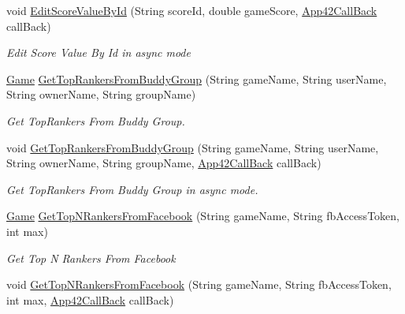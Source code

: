 \begin{DoxyCompactItemize}
void \hyperlink{classcom_1_1shephertz_1_1app42_1_1paas_1_1sdk_1_1csharp_1_1game_1_1_score_board_service_af598d5892afefa1c9a77d72020ccd635}{Edit\+Score\+Value\+By\+Id} (String score\+Id, double game\+Score, \hyperlink{interfacecom_1_1shephertz_1_1app42_1_1paas_1_1sdk_1_1csharp_1_1_app42_call_back}{App42\+Call\+Back} call\+Back)
\begin{DoxyCompactList}\small\item\em Edit Score Value By Id in async mode \end{DoxyCompactList}\item 
\hyperlink{classcom_1_1shephertz_1_1app42_1_1paas_1_1sdk_1_1csharp_1_1game_1_1_game}{Game} \hyperlink{classcom_1_1shephertz_1_1app42_1_1paas_1_1sdk_1_1csharp_1_1game_1_1_score_board_service_a1d2db024944281f8d20b51d2cec665e6}{Get\+Top\+Rankers\+From\+Buddy\+Group} (String game\+Name, String user\+Name, String owner\+Name, String group\+Name)
\begin{DoxyCompactList}\small\item\em Get Top\+Rankers From Buddy Group. \end{DoxyCompactList}\item 
void \hyperlink{classcom_1_1shephertz_1_1app42_1_1paas_1_1sdk_1_1csharp_1_1game_1_1_score_board_service_a6509a9ad8309b5bf2dda9cb7e4d017aa}{Get\+Top\+Rankers\+From\+Buddy\+Group} (String game\+Name, String user\+Name, String owner\+Name, String group\+Name, \hyperlink{interfacecom_1_1shephertz_1_1app42_1_1paas_1_1sdk_1_1csharp_1_1_app42_call_back}{App42\+Call\+Back} call\+Back)
\begin{DoxyCompactList}\small\item\em Get Top\+Rankers From Buddy Group in async mode. \end{DoxyCompactList}\item 
\hyperlink{classcom_1_1shephertz_1_1app42_1_1paas_1_1sdk_1_1csharp_1_1game_1_1_game}{Game} \hyperlink{classcom_1_1shephertz_1_1app42_1_1paas_1_1sdk_1_1csharp_1_1game_1_1_score_board_service_ae2aebf892bd61bc2189074a009d4e443}{Get\+Top\+N\+Rankers\+From\+Facebook} (String game\+Name, String fb\+Access\+Token, int max)
\begin{DoxyCompactList}\small\item\em Get Top N Rankers From Facebook \end{DoxyCompactList}\item 
void \hyperlink{classcom_1_1shephertz_1_1app42_1_1paas_1_1sdk_1_1csharp_1_1game_1_1_score_board_service_af311ad8cd32dfa81d93d236955fe2f4d}{Get\+Top\+N\+Rankers\+From\+Facebook} (String game\+Name, String fb\+Access\+Token, int max, \hyperlink{interfacecom_1_1shephertz_1_1app42_1_1paas_1_1sdk_1_1csharp_1_1_app42_call_back}{App42\+Call\+Back} call\+Back)

\end{DoxyCompactItemize}
